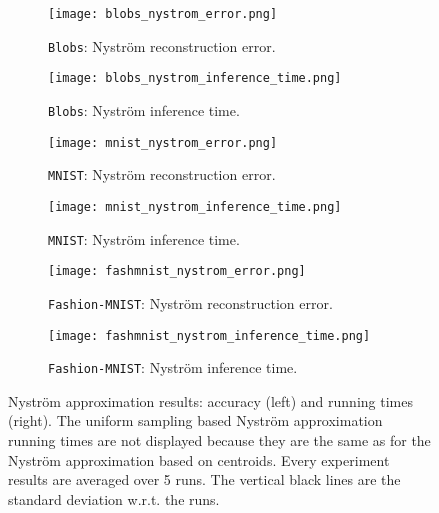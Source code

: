 \begin{figure*}
\begin{subfigure}[b]{.49\textwidth}
\texttt{[image: blobs\_nystrom\_error.png]}
\caption{\texttt{Blobs}: Nyström reconstruction error.}
\label{fig:blobs:nystrom_error}
\end{subfigure}
\begin{subfigure}[b]{.49\textwidth}
\texttt{[image: blobs\_nystrom\_inference\_time.png]}
\caption{\texttt{Blobs}: Nyström inference time.}
\label{fig:blobs:nystrom_time}
\end{subfigure}
\begin{subfigure}[b]{.49\textwidth}
\texttt{[image: mnist\_nystrom\_error.png]}
\caption{\texttt{MNIST}: Nyström reconstruction error.}
\label{fig:mnist:nystrom_error}
\end{subfigure}
\begin{subfigure}[b]{.49\textwidth}
\texttt{[image: mnist\_nystrom\_inference\_time.png]}
\caption{\texttt{MNIST}: Nyström inference time.}
\label{fig:mnist:nystrom_time}
\end{subfigure}
\begin{subfigure}[b]{.49\textwidth}
\texttt{[image: fashmnist\_nystrom\_error.png]}
\caption{\texttt{Fashion-MNIST}: Nyström reconstruction error.}
\label{fig:fashmnist:nystrom_error}
\end{subfigure}
\begin{subfigure}[b]{.49\textwidth}
\texttt{[image: fashmnist\_nystrom\_inference\_time.png]}
\caption{\texttt{Fashion-MNIST}: Nyström inference time.}
\label{fig:fashmnist:nystrom_time}
\end{subfigure}
\caption{Nystr\"om approximation results: accuracy (left) and running times (right). The uniform sampling based Nyström approximation running times are not displayed because they are the same as for the Nyström approximation based on \kmeans centroids. Every experiment results are averaged over 5 runs. The vertical black lines are the standard deviation w.r.t. the runs.}
\label{fig:nystrom}
\end{figure*}




